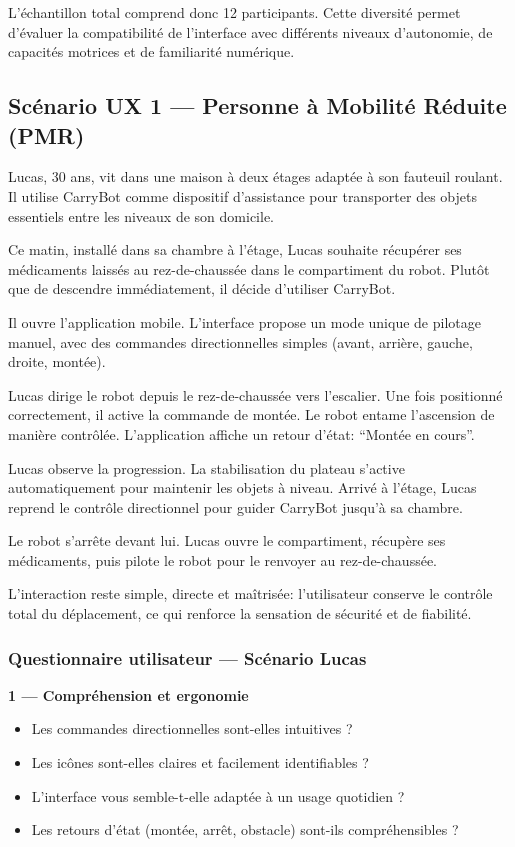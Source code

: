 \documentclass[12pt,a4paper]{article}
\begin{document}
L’échantillon total comprend donc 12 participants.
Cette diversité permet d’évaluer la compatibilité de l’interface
avec différents niveaux d’autonomie,
de capacités motrices et de familiarité numérique.

\newpage

\subsection{Scénario UX 1 — Personne à Mobilité Réduite (PMR)}

Lucas, 30 ans, vit dans une maison à deux étages adaptée à son fauteuil roulant. Il utilise CarryBot comme dispositif d’assistance pour transporter des objets essentiels entre les niveaux de son domicile.

Ce matin, installé dans sa chambre à l’étage, Lucas souhaite récupérer ses médicaments laissés au rez-de-chaussée dans le compartiment du robot. Plutôt que de descendre immédiatement, il décide d’utiliser CarryBot.

Il ouvre l’application mobile. L’interface propose un mode unique de pilotage manuel, avec des commandes directionnelles simples (avant, arrière, gauche, droite, montée).

Lucas dirige le robot depuis le rez-de-chaussée vers l’escalier. Une fois positionné correctement, il active la commande de montée. Le robot entame l’ascension de manière contrôlée. L’application affiche un retour d’état: “Montée en cours”.

Lucas observe la progression. La stabilisation du plateau s’active automatiquement pour maintenir les objets à niveau. Arrivé à l’étage, Lucas reprend le contrôle directionnel pour guider CarryBot jusqu’à sa chambre.

Le robot s’arrête devant lui. Lucas ouvre le compartiment, récupère ses médicaments, puis pilote le robot pour le renvoyer au rez-de-chaussée.

L’interaction reste simple, directe et maîtrisée: l’utilisateur conserve le contrôle total du déplacement, ce qui renforce la sensation de sécurité et de fiabilité.

\subsubsection*{Questionnaire utilisateur — Scénario Lucas}

\textbf{1 — Compréhension et ergonomie}
\begin{itemize}
    \item Les commandes directionnelles sont-elles intuitives ?
    \item Les icônes sont-elles claires et facilement identifiables ?
    \item L’interface vous semble-t-elle adaptée à un usage quotidien ?
    \item Les retours d’état (montée, arrêt, obstacle) sont-ils compréhensibles ?
\end{itemize}
\end{document}
